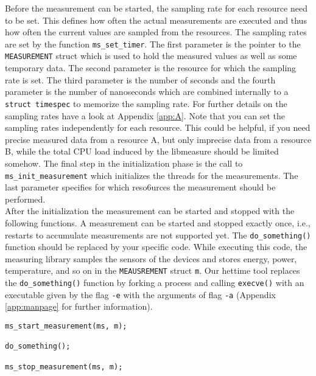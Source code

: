 Before the measurement can be started, the sampling rate for each resource need to be set. This defines how often the actual measurements are executed and thus how often the current values are sampled from the resources. The sampling rates are set by the function \texttt{ms\_set\_timer}. The first parameter is the pointer to the \texttt{MEASUREMENT} struct which is used to hold the measured values as well as some temporary data. The second parameter is the resource for which the sampling rate is set. The third parameter is the number of seconds and the fourth parameter is the number of nanoseconds which are combined internally to a \texttt{struct timespec} to memorize the sampling rate.  For further details on the sampling rates have a look at Appendix \ref{app:A}. Note that you can set the sampling rates independently for each resource. This could be helpful, if you need precise measured data from a resource A, but only imprecise data from a resource B, while the total CPU load induced by the libmeasure should be limited somehow. The final step in the initialization phase is the call to \texttt{ms\_init\_measurement} which initializes the threads for the measurements. The last parameter specifies for which reso6urces the measurement should be performed.\\

After the initialization the measurement can be started and stopped with the following functions. A measurement can be started and stopped exactly once, i.e., restarts to accumulate measurements are not supported yet. The \texttt{do\_something()} function should be replaced by your specific code. While executing this code, the measuring library samples the sensors of the devices and stores energy, power, temperature, and so on in the \texttt{MEAUSREMENT} struct \texttt{m}. Our hettime tool replaces the \texttt{do\_something()} function by forking a process and calling \texttt{execve()} with an executable given by the flag \texttt{-e} with the arguments of flag \texttt{-a} (Appendix \ref{app:manpage} for further information).
\begin{lstlisting}[caption={The start and stop functions trigger the measuring procedures of the measuring library. Please replace the \texttt{do\_something()} function by the code you want to execute while the measuring system is running.},label=lst:StartStopMS]
ms_start_measurement(ms, m);

do_something();

ms_stop_measurement(ms, m);
\end{lstlisting}

